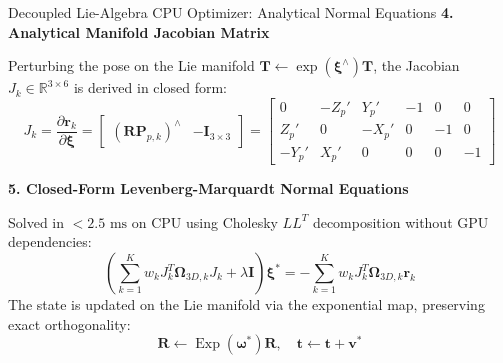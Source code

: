 \documentclass[aspectratio=169, 10pt]{beamer}
\begin{document}
\begin{frame}{Decoupled Lie-Algebra CPU Optimizer: Analytical Normal Equations}
  {\normalsize \textbf{\textcolor{NavyBlue}{4. Analytical Manifold Jacobian Matrix}}}
  \vspace{0.1cm}

  Perturbing the pose on the Lie manifold $\mathbf{T} \leftarrow \exp(\boldsymbol{\xi}^\wedge) \mathbf{T}$, the Jacobian $J_k \in \mathbb{R}^{3 \times 6}$ is derived in closed form:
  \begin{equation}
    J_k = \frac{\partial \mathbf{r}_k}{\partial \boldsymbol{\xi}} = \begin{bmatrix} (\mathbf{R} \mathbf{P}_{p,k})^\wedge & -\mathbf{I}_{3 \times 3} \end{bmatrix} = \begin{bmatrix}
      0 & -Z_p' & Y_p' & -1 & 0 & 0 \\[3pt]
      Z_p' & 0 & -X_p' & 0 & -1 & 0 \\[3pt]
      -Y_p' & X_p' & 0 & 0 & 0 & -1
    \end{bmatrix}
  \end{equation}

  \vspace{0.2cm}
  {\normalsize \textbf{\textcolor{NavyBlue}{5. Closed-Form Levenberg-Marquardt Normal Equations}}}
  \vspace{0.1cm}

  Solved in $<2.5\text{ ms}$ on CPU using Cholesky $LL^T$ decomposition without GPU dependencies:
  \begin{equation}
    \left( \sum_{k=1}^K w_k J_k^T \mathbf{\Omega}_{3D,k} J_k + \lambda \mathbf{I} \right) \boldsymbol{\xi}^* = -\sum_{k=1}^K w_k J_k^T \mathbf{\Omega}_{3D,k} \mathbf{r}_k
  \end{equation}
  The state is updated on the Lie manifold via the exponential map, preserving exact orthogonality:
  \begin{equation}
    \mathbf{R} \leftarrow \operatorname{Exp}(\boldsymbol{\omega}^*) \mathbf{R}, \quad \mathbf{t} \leftarrow \mathbf{t} + \mathbf{v}^*
  \end{equation}
\end{frame}
\end{document}
